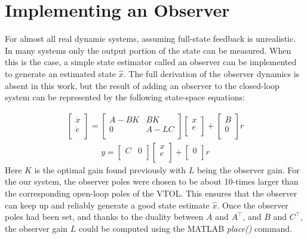 \documentclass[dvips,12pt]{article}
\begin{document}
\section{Implementing an Observer}

For almost all real dynamic systems, assuming full-state feedback is unrealistic.  In many systems only the output portion of the state can be measured.  When this is the case, a simple state estimator called an observer can be implemented to generate an estimated state $\hat{x}$. The full derivation of the observer dynamics is absent in this work, but the result of adding an observer to the closed-loop system can be represented by the following state-space equations:

{\begin{gather}
 \begin{bmatrix}
     \dot{x} \\
     \dot{e} \\
   \end{bmatrix}
   =   
   \begin{bmatrix}
        A-BK & BK  \\
        0 & A-LC  \\
      \end{bmatrix}
      \begin{bmatrix}
           x \\
           e \\
         \end{bmatrix}
         +
         \begin{bmatrix}
                    B \\
                    0 \\
                  \end{bmatrix}
                  r         
\end{gather}}
{\begin{gather}
   y
   =   
   \begin{bmatrix}
        C & 0  \\
      \end{bmatrix}
      \begin{bmatrix}
           x \\
           e \\
         \end{bmatrix}
         +
         \begin{bmatrix}
                    0 \\
                  \end{bmatrix}
                  r         
\end{gather}}
Here $K$ is the optimal gain found previously with $L$ being the observer gain.  For the our system, the observer poles were chosen to be about 10-times larger than the corresponding open-loop poles of the VTOL.  This ensures that the observer can keep up and reliably generate a good state estimate $\hat{x}$.  Once the observer poles had been set, and thanks to the duality between $A$ and $A^\intercal$, and $B$ and $C^\intercal$,  the observer gain $L$ could be computed using the MATLAB \textit{place()} command.
\end{document}
